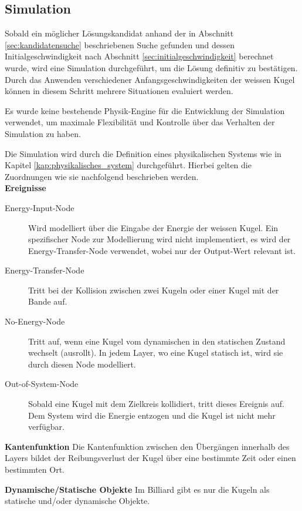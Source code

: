 \newpage
\subsection{Simulation}\label{kap:simulation}
Sobald ein möglicher Lösungskandidat anhand der in Abschnitt \ref{sec:kandidatensuche} beschriebenen Suche gefunden
und dessen Initialgeschwindigkeit nach Abschnitt \ref{sec:initialgeschwindigkeit} berechnet wurde,
wird eine Simulation durchgeführt, um die Lösung definitiv zu bestätigen.
Durch das Anwenden verschiedener Anfangsgeschwindigkeiten der weissen Kugel können in diesem Schritt mehrere Situationen evaluiert werden.

Es wurde keine bestehende Physik-Engine für die Entwicklung der Simulation verwendet,
um maximale Flexibilität und Kontrolle über das Verhalten der Simulation zu haben.

Die Simulation wird durch die Definition eines physikalischen Systems wie in Kapitel \ref{kap:physikalisches_system} durchgeführt.
Hierbei gelten die Zuordnungen wie sie nachfolgend beschrieben werden.\\
\textbf{Ereignisse}
\begin{description}
    \item[Energy-Input-Node] Wird modelliert über die Eingabe der Energie der weissen Kugel. Ein spezifischer Node zur
    Modellierung wird nicht implementiert, es wird der Energy-Transfer-Node verwendet, wobei nur der Output-Wert relevant ist.
    \item[Energy-Transfer-Node] Tritt bei der Kollision zwischen zwei Kugeln oder einer Kugel mit der Bande auf.
    \item[No-Energy-Node] Tritt auf, wenn eine Kugel vom dynamischen in den statischen Zustand wechselt (ausrollt). In jedem
    Layer, wo eine Kugel statisch ist, wird sie durch diesen Node modelliert.
    \item[Out-of-System-Node] Sobald eine Kugel mit dem Zielkreis kollidiert, tritt dieses Ereignis auf. Dem System wird die
    Energie entzogen und die Kugel ist nicht mehr verfügbar.
\end{description}

\textbf{Kantenfunktion}
Die Kantenfunktion zwischen den Übergängen innerhalb des Layers bildet der Reibungsverlust der
Kugel über eine bestimmte Zeit oder einen bestimmten Ort.

\textbf{Dynamische/Statische Objekte}
Im Billiard gibt es nur die Kugeln als statische und/oder dynamische Objekte.

